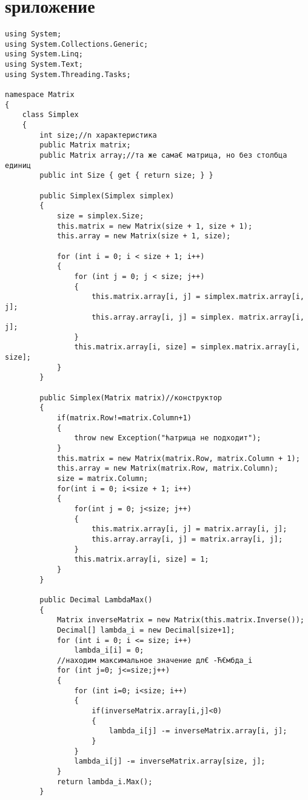 \documentclass[12pt]{article} %
\begin{document}
\section{ѕриложение}
\begin{verbatim}
using System;
using System.Collections.Generic;
using System.Linq;
using System.Text;
using System.Threading.Tasks;

namespace Matrix
{
    class Simplex
    {
        int size;//n характеристика
        public Matrix matrix;
        public Matrix array;//та же сама€ матрица, но без столбца единиц
        public int Size { get { return size; } }

        public Simplex(Simplex simplex)
        {
            size = simplex.Size;
            this.matrix = new Matrix(size + 1, size + 1);            
            this.array = new Matrix(size + 1, size);
            
            for (int i = 0; i < size + 1; i++)
            {
                for (int j = 0; j < size; j++)
                {
                    this.matrix.array[i, j] = simplex.matrix.array[i, j];
                    this.array.array[i, j] = simplex. matrix.array[i, j];
                }
                this.matrix.array[i, size] = simplex.matrix.array[i, size];
            }
        }

        public Simplex(Matrix matrix)//конструктор
        {
            if(matrix.Row!=matrix.Column+1)
            {
                throw new Exception("ћатрица не подходит");
            }
            this.matrix = new Matrix(matrix.Row, matrix.Column + 1);
            this.array = new Matrix(matrix.Row, matrix.Column);
            size = matrix.Column;
            for(int i = 0; i<size + 1; i++)
            {
                for(int j = 0; j<size; j++)
                {
                    this.matrix.array[i, j] = matrix.array[i, j];
                    this.array.array[i, j] = matrix.array[i, j];
                }
                this.matrix.array[i, size] = 1;
            }
        }

        public Decimal LambdaMax()
        {
            Matrix inverseMatrix = new Matrix(this.matrix.Inverse());
            Decimal[] lambda_i = new Decimal[size+1];
            for (int i = 0; i <= size; i++)
                lambda_i[i] = 0;
            //находим максимальное значение дл€ -Ћ€мбда_i 
            for (int j=0; j<=size;j++)
            {
                for (int i=0; i<size; i++)
                {
                    if(inverseMatrix.array[i,j]<0)
                    {
                        lambda_i[j] -= inverseMatrix.array[i, j];
                    }
                }
                lambda_i[j] -= inverseMatrix.array[size, j];
            }
            return lambda_i.Max();
        }



\end{verbatim}
\end{document}
